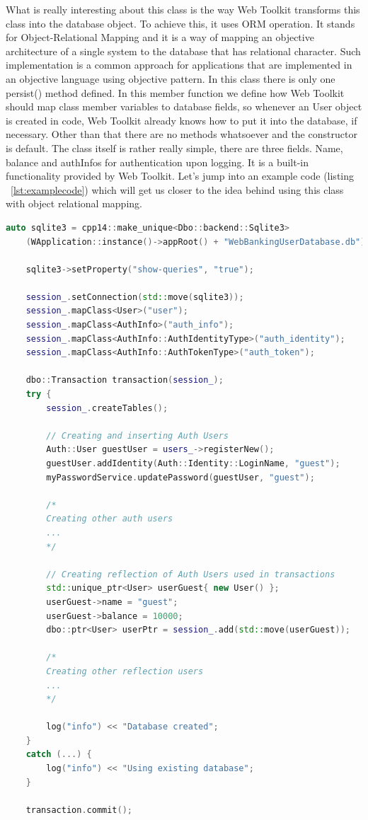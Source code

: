 \documentclass[a4paper,12pt]{book}
\begin{document}
What is really interesting about this class is the way Web Toolkit transforms this class into the database object. To achieve this, it uses ORM operation. It stands for Object-Relational Mapping and it is a way of mapping an objective architecture of a single system to the database that has relational character. Such implementation is a common approach for applications that are implemented in an objective language using objective pattern. In this class there is only one persist() method defined. In this member function we define how Web Toolkit should map class member variables to database fields, so whenever an User object is created in code, Web Toolkit already knows how to put it into the database, if necessary. Other than that there are no methods whatsoever and the constructor is default. The class itself is rather really simple, there are three fields. Name, balance and authInfos for authentication upon logging. It is a built-in functionality provided by Web Toolkit. Let's jump into an example code (listing ~\ref{lst:examplecode}) which will get us closer to the idea behind using this class with object relational mapping.

\bigskip
\begin{lstlisting}[frame=single, label={lst:examplecode}, basicstyle=\small, language=C++, caption={Example usage of object-relational mapping on User class. This logic happens in constructor of Session class, which is called upon turning the application on.}, captionpos=b]
	auto sqlite3 = cpp14::make_unique<Dbo::backend::Sqlite3>
	(WApplication::instance()->appRoot() + "WebBankingUserDatabase.db");

	sqlite3->setProperty("show-queries", "true");

	session_.setConnection(std::move(sqlite3));
	session_.mapClass<User>("user");
	session_.mapClass<AuthInfo>("auth_info");
	session_.mapClass<AuthInfo::AuthIdentityType>("auth_identity");
	session_.mapClass<AuthInfo::AuthTokenType>("auth_token");
	
	dbo::Transaction transaction(session_);
	try {
		session_.createTables();
	
		// Creating and inserting Auth Users
		Auth::User guestUser = users_->registerNew();
		guestUser.addIdentity(Auth::Identity::LoginName, "guest");
		myPasswordService.updatePassword(guestUser, "guest");
		
		/*
		Creating other auth users
		...
		*/
		
		// Creating reflection of Auth Users used in transactions
		std::unique_ptr<User> userGuest{ new User() };
		userGuest->name = "guest";
		userGuest->balance = 10000;
		dbo::ptr<User> userPtr = session_.add(std::move(userGuest));
		
		/*
		Creating other reflection users
		...
		*/
		
		log("info") << "Database created";
	}
	catch (...) {
		log("info") << "Using existing database";
	}

	transaction.commit();
		
\end{lstlisting}
	
\end{document}
